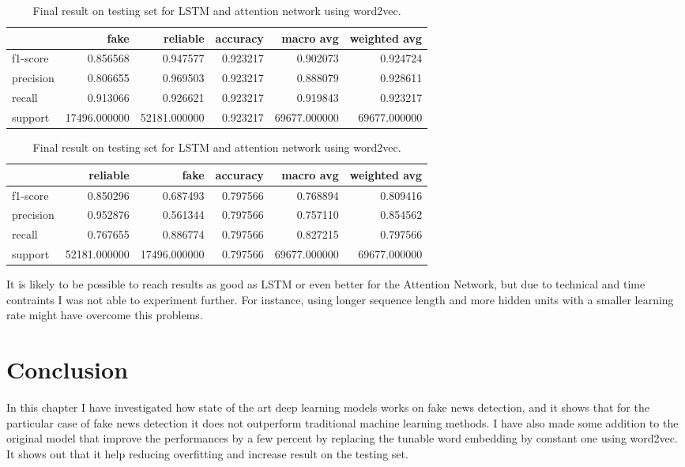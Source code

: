 \begin{table}
	\begin{subtable}{\textwidth}
		\begin{tabular}{lrrrrr}
		\toprule
		{} &          fake &      reliable &  accuracy &     macro avg &  weighted avg \\
		\midrule
		f1-score  &      0.856568 &      0.947577 &  0.923217 &      0.902073 &      0.924724 \\
		precision &      0.806655 &      0.969503 &  0.923217 &      0.888079 &      0.928611 \\
		recall    &      0.913066 &      0.926621 &  0.923217 &      0.919843 &      0.923217 \\
		support   &  17496.000000 &  52181.000000 &  0.923217 &  69677.000000 &  69677.000000 \\
		\bottomrule
		\end{tabular}
		\caption{LSTM + word2vec results on \textbf{Fake News Corpus}}
	\end{subtable}
	\begin{subtable}{\textwidth}
		\begin{tabular}{lrrrrr}
		\toprule
		{} &      reliable &          fake &  accuracy &     macro avg &  weighted avg \\
		\midrule
		f1-score  &      0.850296 &      0.687493 &  0.797566 &      0.768894 &      0.809416 \\
		precision &      0.952876 &      0.561344 &  0.797566 &      0.757110 &      0.854562 \\
		recall    &      0.767655 &      0.886774 &  0.797566 &      0.827215 &      0.797566 \\
		support   &  52181.000000 &  17496.000000 &  0.797566 &  69677.000000 &  69677.000000 \\
		\bottomrule
		\end{tabular}
		\caption{Attention Network + word2vec on \textbf{Fake News Corpus}}
	\end{subtable}
	\caption{Final result on testing set for LSTM and attention network using word2vec.}
	\label{table:chap4:results2}
\end{table}
It is likely to be possible to reach results as good as LSTM or even better for the Attention Network, but due to technical and time contraints I was not able to experiment further. For instance, using longer sequence length and more hidden units with a smaller learning rate might have overcome this problems. 
\section{Conclusion}
In this chapter I have investigated how state of the art deep learning models works on fake news detection, and it shows that for the particular case of fake news detection it does not outperform traditional machine learning methods. I have also made some addition to the original model that improve the performances by a few percent by replacing the tunable word embedding by constant one using word2vec. It shows out that it help reducing overfitting and increase result on the testing set. \\


